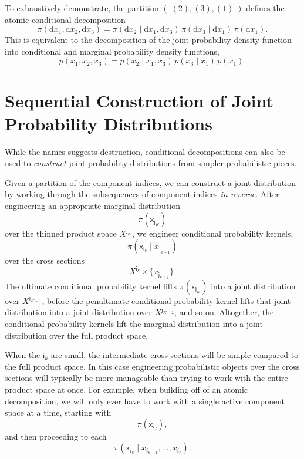 \documentclass[
  letterpaper,
  DIV=11,
  numbers=noendperiod]{scrartcl}
\begin{document}
To exhaustively demonstrate, the partition
\(( \; ( 2 ), ( 3 ), ( 1 ) \; )\) defines the atomic conditional
decomposition \[
\pi( \mathrm{d} x_{1}, \mathrm{d} x_{2}, \mathrm{d} x_{3} )
=
\pi( \mathrm{d} x_{2} \mid \mathrm{d} x_{1}, \mathrm{d} x_{3} ) \,
\pi( \mathrm{d} x_{3} \mid \mathrm{d} x_{1} ) \,
\pi( \mathrm{d} x_{1} ).
\] This is equivalent to the decomposition of the joint probability
density function into conditional and marginal probability density
functions, \[
p( x_{1}, x_{2}, x_{3} )
=
p( x_{2} \mid x_{1}, x_{3} ) \,
p( x_{3} \mid x_{1} ) \,
p( x_{1} ).
\]

\section{Sequential Construction of Joint Probability
Distributions}\label{sequential-construction-of-joint-probability-distributions}

While the names suggests destruction, conditional decompositions can
also be used to \emph{construct} joint probability distributions from
simpler probabilistic pieces.

Given a partition of the component indices, we can construct a joint
distribution by working through the subsequences of component indices
\emph{in reverse}. After engineering an appropriate marginal
distribution \[
\pi( \mathsf{x}_{ \mathsf{j}_{K} } )
\] over the thinned product space \(X^{ \mathsf{j}_{K} }\), we engineer
conditional probability kernels, \[
\pi( \mathsf{x}_{ \mathsf{i}_{k} } \mid x_{\mathsf{j}_{k + 1}} )
\] over the cross sections \[
X^{ \mathsf{i}_{k} } \times \{ x_{ \mathsf{j}_{k + 1} } \}.
\] The ultimate conditional probability kernel lifts
\(\pi( \mathsf{x}_{ \mathsf{j}_{K} } )\) into a joint distribution over
\(X^{ \mathsf{j}_{K - 1} }\), before the penultimate conditional
probability kernel lifts that joint distribution into a joint
distribution over \(X^{ \mathsf{j}_{K - 2} }\), and so on. Altogether,
the conditional probability kernels lift the marginal distribution into
a joint distribution over the full product space.

When the \(\mathsf{i}_{k}\) are small, the intermediate cross sections
will be simple compared to the full product space. In this case
engineering probabilistic objects over the cross sections will typically
be more manageable than trying to work with the entire product space at
once. For example, when building off of an atomic decomposition, we will
only ever have to work with a single active component space at a time,
starting with \[
\pi( \mathsf{x}_{ i_{I} } ),
\] and then proceeding to each \[
\pi(
  \mathsf{x}_{ i_{k} } \mid
  x_{ i_{k + 1} }, \ldots, x_{ i_{I} }
).
\]
\end{document}
